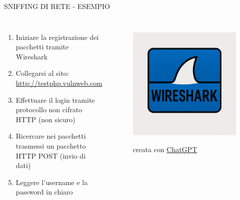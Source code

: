 \documentclass[aspectratio=1610]{beamer}
\begin{document}
\begin{frame}{SNIFFING DI RETE - ESEMPIO}
    \begin{columns}
            \justifying
            \begin{enumerate}
                \item Iniziare la registrazione dei pacchetti tramite Wireshark
                \pause
                \item Collegarsi al sito: \href{http://testphp.vulnweb.com/login.php}{http://testphp.vulnweb.com}
                \pause
                \item Effettuare il login tramite protocollo non cifrato HTTP (non sicuro)
                \pause
                \item Ricercare nei pacchetti trasmessi un pacchetto HTTP POST (invio di dati)
                \pause
                \item Leggere l'username e la password in chiaro
            \end{enumerate}                        
            \begin{figure}
                \href{https://www.wireshark.org/}{\includegraphics[width=\linewidth]{img/wireshark.png}}
                \caption{{creata con \href{https://chatgpt.com/}{ChatGPT}}}
            \end{figure}
    \end{columns}
\end{frame}
\end{document}
